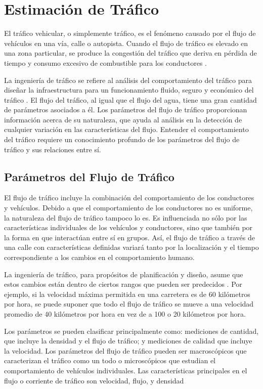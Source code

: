 \chapter{Estimación de Tráfico}

El tráfico vehicular, o simplemente tráfico, es el fenómeno causado por el flujo de vehículos en una vía, calle o autopista. Cuando el flujo de tráfico es elevado en una zona particular, se produce la congestión del tráfico que deriva en pérdida de tiempo y consumo excesivo de combustible para los conductores \cite{litman2011smart}.

La ingeniería de tráfico se refiere al análisis del comportamiento del tráfico para diseñar la infraestructura para un funcionamiento fluido, seguro y económico del tráfico \cite{kadiyali1987traffic}. El flujo del tráfico, al igual que el flujo del agua, tiene una gran cantidad de parámetros asociados a él. Los parámetros del flujo de tráfico proporcionan información acerca de su naturaleza, que ayuda al análisis en la detección de cualquier variación en las características del flujo. Entender el comportamiento del tráfico requiere un conocimiento profundo de los parámetros del flujo de tráfico y sus relaciones entre sí.

\section{Parámetros del Flujo de Tráfico}

El flujo de tráfico incluye la combinación del comportamiento de los conductores y vehículos. Debido a que el comportamiento de los conductores no es uniforme, la naturaleza del flujo de tráfico tampoco lo es. Es influenciada no sólo por las características individuales de los vehículos y conductores, sino que también por la forma en que interactúan entre sí en grupos. Así, el flujo de tráfico a través de una calle con características definidas variará tanto por la localización y el tiempo correspondiente a los cambios en el comportamiento humano.

La ingeniería de tráfico, para propósitos de planificación y diseño, asume que estos cambios están dentro de ciertos rangos que pueden ser predecidos \cite{papacostas1987fundamentals}. Por ejemplo, si la velocidad máxima permitida en una carretera es de 60 kilómetros por hora, se puede suponer que todo el flujo de tráfico se mueve a una velocidad promedio de 40 kilómetros por hora en vez de a 100 o 20 kilómetros por hora. 

Los parámetros se pueden clasificar principalmente como: mediciones de cantidad, que incluye la densidad y el flujo de tráfico; y mediciones de calidad que incluye la velocidad. Los parámetros del flujo de tráfico pueden ser macroscópicos que caracterizan el tráfico como un todo o microscópicos que estudian el comportamiento de vehículos individuales. Las características principales en el flujo o corriente de tráfico son velocidad, flujo, y densidad \cite{may1990fundamentals}

